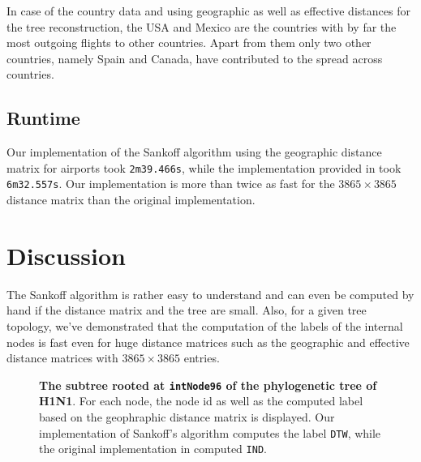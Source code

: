 \documentclass{article}
\begin{document}
In case of the country data and using geographic as well as effective distances for the tree reconstruction, the USA and Mexico are the countries with by far the most outgoing flights to other countries. Apart from them only two other countries, namely Spain and Canada, have contributed to the spread across countries.

\subsection{Runtime}
Our implementation of the Sankoff algorithm using the geographic distance
matrix for airports took \texttt{2m39.466s}, while the implementation provided in
\cite{reimeringPhylogeographicReconstructionUsing2020} took \texttt{6m32.557s}.
Our implementation is more than twice as fast for the $3865 \times 3865$
distance matrix than the original implementation.


\section{Discussion}
The Sankoff algorithm is rather easy to understand and can even be computed by
hand if the distance matrix and the tree are small. Also, for a given tree
topology, we've demonstrated that the computation of the labels of the internal
nodes is fast even for huge distance matrices such as the geographic and
effective distance matrices with $3865 \times 3865$ entries.

\begin{figure}[h]
    \centering
    \caption{\textbf{The subtree rooted at \texttt{intNode96} of the
    phylogenetic tree of H1N1}. For each node, the node id as well as the computed
    label based on the geophraphic distance matrix is displayed. Our implementation of Sankoff's algorithm computes the
    label \texttt{DTW}, while the original implementation in
    \cite{reimeringPhylogeographicReconstructionUsing2020} computed \texttt{IND}.}
    \label{fig:subtree}
  \end{figure}
\end{document}
